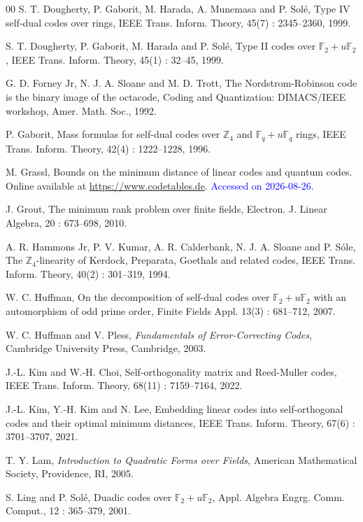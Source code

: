 \documentclass{article}
\theoremstyle{definition}
\theoremstyle{remark}
\begin{document}
\begin{thebibliography}{00}
 S. T. Dougherty, P. Gaborit, M. Harada, A. Munemasa and P. Sol\'e, Type IV self-dual codes over rings, IEEE Trans. Inform. Theory, 45(7) : 2345--2360, 1999.

 S. T. Dougherty, P. Gaborit, M. Harada and P. Sol\'e, Type II codes over $\mathbb{F}_2+u\mathbb{F}_2$, IEEE Trans. Inform. Theory, 45(1) : 32--45, 1999.

 G. D. Forney Jr, N. J. A. Sloane and M. D. Trott, The Nordstrom-Robinson code is the binary image of the octacode, Coding and Quantization: DIMACS/IEEE workshop, Amer. Math. Soc., 1992.

 P. Gaborit, Mass formulas for self-dual codes over $\mathbb{Z}_4$ and $\mathbb{F}_q+u\mathbb{F}_q$ rings, IEEE Trans. Inform. Theory, 42(4) : 1222--1228, 1996.

 M. Grassl, Bounds on the minimum distance of linear codes and quantum codes.
Online available at \url{https://www.codetables.de}.
\textcolor{blue}{Accessed on 2026-08-26}.

 J. Grout, The minimum rank problem over finite fields, Electron. J. Linear Algebra, 20 : 673--698, 2010.

 A. R. Hammons Jr, P. V. Kumar, A. R. Calderbank, N. J. A. Sloane and P. S\'ole, The $\mathbb{Z}_4$-linearity of Kerdock, Preparata, Goethals and related codes, IEEE Trans. Inform. Theory, 40(2) : 301--319, 1994.

 W. C. Huffman, On the decomposition of self-dual codes over $\mathbb{F}_2+u\mathbb{F}_2$ with an automorphism of odd prime order, Finite Fields Appl. 13(3) : 681--712, 2007.

 W. C. Huffman and V. Pless, {\it Fundamentals of Error-Correcting Codes}, Cambridge University Press, Cambridge, 2003.

 J.-L. Kim and W.-H. Choi, Self-orthogonality matrix and Reed-Muller codes, IEEE Trans. Inform. Theory, 68(11) :  7159--7164, 2022.

 J.-L. Kim, Y.-H. Kim and N. Lee, Embedding linear codes into self-orthogonal codes and their optimal minimum distances, IEEE Trans. Inform. Theory, 67(6) : 3701--3707, 2021.

 T. Y. Lam, \emph{Introduction to Quadratic Forms over Fields}, American Mathematical Society, Providence, RI, 2005.

 S. Ling and P. Sol\'e, Duadic codes over $\mathbb{F}_2+u\mathbb{F}_2$, Appl. Algebra Engrg. Comm. Comput., 12 : 365--379, 2001.


\end{thebibliography}
\end{document}
